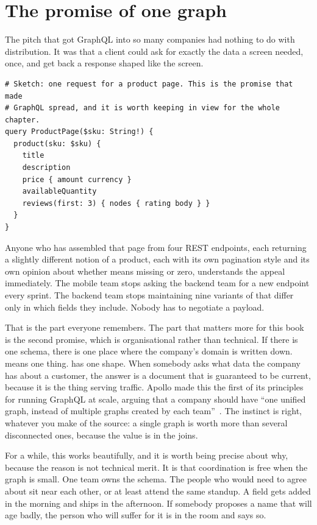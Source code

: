 \section{The promise of one graph}
\label{sec:ch01-promise}

The pitch that got GraphQL into so many companies had nothing to do with
distribution. It was that a client could ask for exactly the data a screen
needed, once, and get back a response shaped like the screen.

\begin{verbatim}
# Sketch: one request for a product page. This is the promise that made
# GraphQL spread, and it is worth keeping in view for the whole chapter.
query ProductPage($sku: String!) {
  product(sku: $sku) {
    title
    description
    price { amount currency }
    availableQuantity
    reviews(first: 3) { nodes { rating body } }
  }
}
\end{verbatim}

Anyone who has assembled that page from four REST endpoints, each returning a
slightly different notion of a product, each with its own pagination style and
its own opinion about whether  means missing or zero, understands the
appeal immediately. The mobile team stops asking the backend team for a new
endpoint every sprint. The backend team stops maintaining nine variants of
 that differ only in which fields they include. Nobody has to
negotiate a payload.

That is the part everyone remembers. The part that matters more for this book is
the second promise, which is organisational rather than technical. If there is
one schema, there is one place where the company's domain is written down.
 means one thing.  has one shape. When somebody asks
what data the company has about a customer, the answer is a document that is
guaranteed to be current, because it is the thing serving traffic. Apollo made
this the first of its principles for running GraphQL at scale, arguing that a
company should have \enquote{one unified graph, instead of multiple graphs
created by each team}~\autocite{schmidt2019principled}. The instinct is right,
whatever you make of the source: a single graph is worth more than several
disconnected ones, because the value is in the
joins.%

%
For a while, this works beautifully, and it is worth being precise about why,
because the reason is not technical merit. It is that coordination is free when
the graph is small. One team owns the schema. The people who would need to
agree about  sit near each other, or at least attend the same
standup. A field gets added in the morning and ships in the afternoon. If
somebody proposes a name that will age badly, the person who will suffer for it
is in the room and says so.

